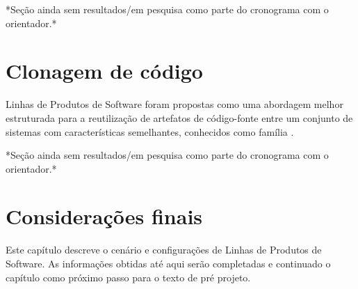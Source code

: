 *Seção ainda sem resultados/em pesquisa como parte do cronograma com o orientador.*

\section{Clonagem de código}

Linhas de Produtos de Software foram propostas como uma abordagem melhor estruturada para a  reutilização de artefatos de código-fonte entre um conjunto de sistemas com características semelhantes, conhecidos como família .	

*Seção ainda sem resultados/em pesquisa como parte do cronograma com o orientador.*

\section{Considerações finais}

Este capítulo descreve o cenário e configurações de Linhas de Produtos de Software. As informações obtidas até aqui serão completadas e continuado o capítulo como próximo passo para o texto de pré projeto.